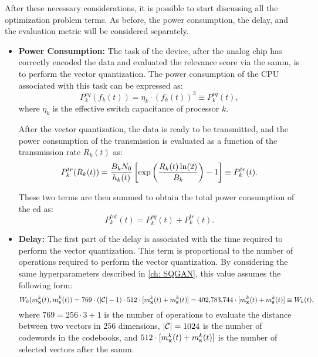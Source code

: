 After these necessary considerations, it is possible to start discussing all the optimization problem terms. As before, the power consumption, the delay, and the evaluation metric will be considered separately.

\begin{itemize}[label={}] 
    \item \textbf{Power Consumption:} The task of the device, after the analog chip has correctly encoded the data and evaluated the relevance score via the \gls{samm}, is to perform the vector quantization. The power consumption of the CPU associated with this task can be expressed as: 
    \begin{equation} 
        P_k^{vq}(f_k(t)) = \eta_k \cdot (f_k(t))^3 \equiv P_k^{vq}(t), 
    \end{equation} where $ \eta_k $ is the effective switch capacitance of processor $k$.

    After the vector quantization, the data is ready to be transmitted, and the power consumption of the transmission is evaluated as a function of the transmission rate $R_k(t)$ as:
    \begin{equation}
        P_k^{tr}(R_k(t)) =  \frac{B_k N_0}{h_k(t)} \left[  {\rm exp} \left(\frac{R_k(t) \ln(2)}{B_k} \right)   -1 \right] \equiv P_k^{tr}(t).
    \end{equation}

    These two terms are then summed to obtain the total power consumption of the \gls{ed} as:
    \begin{equation}
        P_k^{tot}(t) = P_k^{vq}(t) + P_k^{tr}(t).
    \end{equation}

    \item \textbf{Delay:} The first part of the delay is associated with the time required to perform the vector quantization. This term is proportional to the number of operations required to perform the vector quantization. By considering the same hyperparameters described in \cref{ch: SQGAN}, this value assumes the following form:
    \begin{equation}
        W_k(m_{\mathbf{x}}^k(t), m_{\mathbf{s}}^k(t)) = 769 \cdot (|\mathcal{C}| - 1) \cdot 512  \cdot [m_{\mathbf{x}}^k(t) + m_{\mathbf{s}}^k(t)] = 402{,}783{,}744 \cdot [m_{\mathbf{x}}^k(t) + m_{\mathbf{s}}^k(t)] \equiv W_k(t),
    \end{equation}
    where $769 = 256 \cdot 3 + 1$ is the number of operations to evaluate the distance between two vectors in $256$ dimensions, $|\mathcal{C}|=1024$ is the number of codewords in the codebooks,  and $512 \cdot [m_{\mathbf{x}}^k(t) + m_{\mathbf{s}}^k(t)]$ is the number of selected vectors after the \gls{samm}.


\end{itemize}
